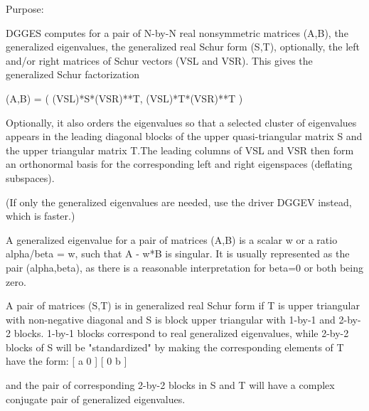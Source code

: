  \begin{DoxyParagraph}{Purpose\+: }
\begin{DoxyVerb} DGGES computes for a pair of N-by-N real nonsymmetric matrices (A,B),
 the generalized eigenvalues, the generalized real Schur form (S,T),
 optionally, the left and/or right matrices of Schur vectors (VSL and
 VSR). This gives the generalized Schur factorization

          (A,B) = ( (VSL)*S*(VSR)**T, (VSL)*T*(VSR)**T )

 Optionally, it also orders the eigenvalues so that a selected cluster
 of eigenvalues appears in the leading diagonal blocks of the upper
 quasi-triangular matrix S and the upper triangular matrix T.The
 leading columns of VSL and VSR then form an orthonormal basis for the
 corresponding left and right eigenspaces (deflating subspaces).

 (If only the generalized eigenvalues are needed, use the driver
 DGGEV instead, which is faster.)

 A generalized eigenvalue for a pair of matrices (A,B) is a scalar w
 or a ratio alpha/beta = w, such that  A - w*B is singular.  It is
 usually represented as the pair (alpha,beta), as there is a
 reasonable interpretation for beta=0 or both being zero.

 A pair of matrices (S,T) is in generalized real Schur form if T is
 upper triangular with non-negative diagonal and S is block upper
 triangular with 1-by-1 and 2-by-2 blocks.  1-by-1 blocks correspond
 to real generalized eigenvalues, while 2-by-2 blocks of S will be
 "standardized" by making the corresponding elements of T have the
 form:
         [  a  0  ]
         [  0  b  ]

 and the pair of corresponding 2-by-2 blocks in S and T will have a
 complex conjugate pair of generalized eigenvalues.\end{DoxyVerb}
 
\end{DoxyParagraph}

